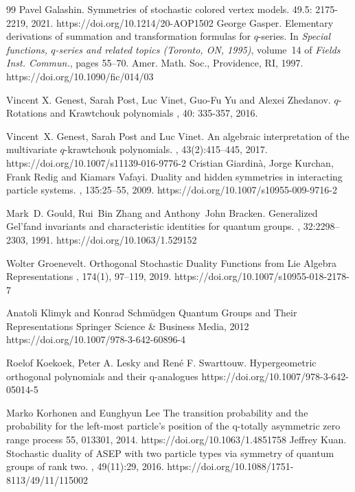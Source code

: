 \documentclass{ximera}
\begin{document}
\begin{thebibliography}{99}
Pavel Galashin.
\newblock Symmetries of stochastic colored vertex models.
 49.5: 2175-2219, 2021.
https://doi.org/10.1214/20-AOP1502
George Gasper.
\newblock Elementary derivations of summation and transformation formulas for
  {$q$}-series.
\newblock In {\em Special functions, {$q$}-series and related topics
  ({T}oronto, {ON}, 1995)}, volume~14 of {\em Fields Inst. Commun.}, pages
  55--70. Amer. Math. Soc., Providence, RI, 1997.
https://doi.org/10.1090/fic/014/03

 Vincent X. Genest, Sarah Post, Luc Vinet, Guo-Fu Yu and Alexei Zhedanov.
\newblock $q$-Rotations and Krawtchouk polynomials
,  40: 335-357, 2016.

Vincent~X. Genest, Sarah Post and Luc Vinet.
\newblock An algebraic interpretation of the multivariate $q$-krawtchouk
  polynomials.
, 43(2):415--445, 2017.
https://doi.org/10.1007/s11139-016-9776-2
Cristian Giardin\`{a}, Jorge Kurchan, Frank Redig and Kiamars Vafayi.
\newblock Duality and hidden symmetries in interacting particle systems.
, 135:25--55, 2009.
https://doi.org/10.1007/s10955-009-9716-2

Mark~D. Gould, Rui~Bin Zhang and Anthony~John Bracken.
\newblock Generalized {G}el'fand invariants and characteristic identities for
  quantum groups.
, 32:2298--2303, 1991.
https://doi.org/10.1063/1.529152

Wolter Groenevelt.
\newblock Orthogonal Stochastic Duality Functions from Lie Algebra Representations
, 174(1), 97--119, 2019.
https://doi.org/10.1007/s10955-018-2178-7

Anatoli Klimyk and Konrad Schm\"{u}dgen
\newblock Quantum Groups and Their Representations
\newblock Springer Science \& Business Media, 2012
https://doi.org/10.1007/978-3-642-60896-4


Roelof Koekoek, Peter A. Lesky and Ren{\'e} F. Swarttouw.
\newblock Hypergeometric orthogonal polynomials and their q-analogues
https://doi.org/10.1007/978-3-642-05014-5


Marko Korhonen and Eunghyun Lee 
\newblock The transition probability and the probability for the left-most particle's position of the q-totally asymmetric zero range process
 55, 013301, 2014. https://doi.org/10.1063/1.4851758
Jeffrey Kuan.
\newblock Stochastic duality of {ASEP} with two particle types via symmetry of
  quantum groups of rank two.
, 49(11):29,
  2016.
https://doi.org/10.1088/1751-8113/49/11/115002




\end{thebibliography}
\end{document}
